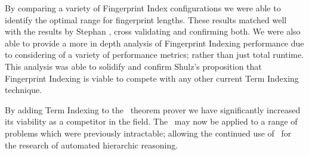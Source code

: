 By comparing a variety of Fingerprint Index configurations we were able to
identify the optimal range for fingerprint lengths. These results matched well
with the results by Stephan , cross validating and confirming both.
We were also able to provide a more in depth analysis of Fingerprint Indexing performance due
to considering of a variety of performance metrics; rather than just total runtime.
This analysis was able to solidify and confirm Shulz's proposition that Fingerprint
Indexing is viable to compete with any other current Term Indexing technique.

By adding Term Indexing to the \beagle\ theorem prover we have significantly increased
its viability as a competitor in the field. The \HSWAC\ may now be applied to a range
of problems which were previously intractable; allowing the continued use of \beagle\ for
the research of automated hierarchic reasoning.

